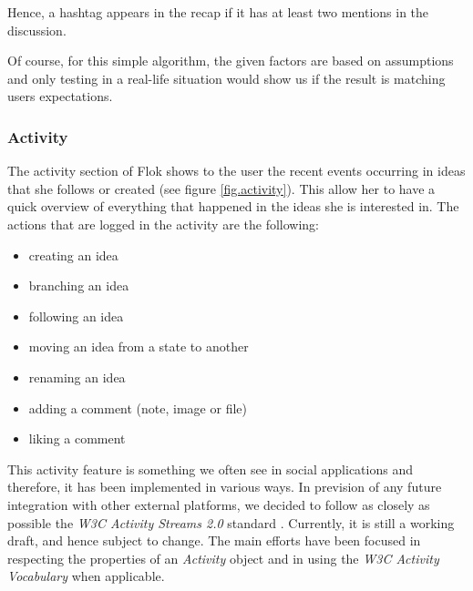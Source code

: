 \documentclass[a4paper,12pt,twoside]{article}
\begin{document}
Hence, a hashtag appears in the recap if it has at least two mentions in the discussion.

Of course, for this simple algorithm, the given factors are based on assumptions and only testing in a real-life situation would show us if the result is matching users expectations.

\subsubsection{Activity}
The activity section of Flok shows to the user the recent events occurring in ideas that she follows or created (see figure \ref{fig.activity}).
This allow her to have a quick overview of everything that happened in the ideas she is interested in.
The actions that are logged in the activity are the following:
\begin{multicols}{2}
    \begin{itemize}
        \item creating an idea
        \item branching an idea
        \item following an idea
        \item moving an idea from a state to another
        \item renaming an idea
        \item adding a comment (note, image or file)
        \item liking a comment
    \end{itemize}
\end{multicols}

This activity feature is something we often see in social applications and therefore, it has been implemented in various ways.
In prevision of any future integration with other external platforms, we decided to follow as closely as possible the \emph{W3C Activity Streams 2.0} standard \cite{snell2015AS2}.
Currently, it is still a working draft, and hence subject to change.
The main efforts have been focused in respecting the properties of an \emph{Activity} object and in using the \emph{W3C Activity Vocabulary} \cite{snell2015AV} when applicable.

\end{document}
